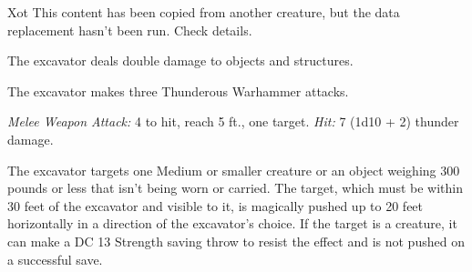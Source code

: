 \documentclass[10pt,a4paper,twoside,bg=print,twocolumn,openany,nodeprecatedcode]{dndbook}
\begin{document}
\begin{DndMonster}[float=t]{Xot}
\DndMonsterBasics[
armor-class = {16 (\textit{breastplate})},
hit-points = {\DndDice{9d8 + 27}},
speed = {30 ft.}
]
\DndMonsterAbilityScores[
 str = 15,
 dex = 14,
 con = 16,
 int = 14,
 wis = 14,
 cha = 12
]
\DndMonsterDetails[
saving-throws = {Con +5, Int +4},
skills = {Arcana +4, Athletics +4, History +4},
languages = {Common plus two other languages},
challenge = 3,
]
This content has been copied from another creature, but the data replacement hasn't been run. Check details.

The excavator deals double damage to objects and structures.

The excavator makes three Thunderous Warhammer attacks.

\textsl{Melee Weapon Attack:} 4 to hit, reach 5 ft., one target. \textsl{Hit:} 7 (1d10 + 2) thunder damage.

The excavator targets one Medium or smaller creature or an object weighing 300 pounds or less that isn't being worn or carried. The target, which must be within 30 feet of the excavator and visible to it, is magically pushed up to 20 feet horizontally in a direction of the excavator's choice. If the target is a creature, it can make a DC 13 Strength saving throw to resist the effect and is not pushed on a successful save.

\end{DndMonster}
\end{document}
